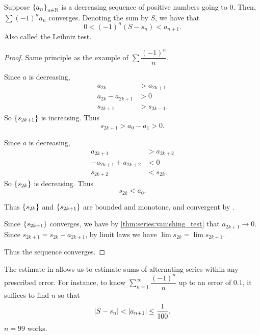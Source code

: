 \begin{thm} \label{thm:series:AST}
    Suppose $\set{a_{n}}_{n \in \N}$ is a decreasing sequence of positive numbers going to 0.
    Then, $\sum (-1)^{n} a_{n}$ converges.
    Denoting the sum by $S$, we have that \[
        0 < (-1)^{n}(S - s_{n}) < a_{n+1}.
    \] Also called the Leibniz test.
\end{thm}
\begin{proof}
    Same principle as the example of $\sum \dfrac{(-1)^{n}}{n}$.
    \begin{paracol}{2}
        \begin{leftcolumn}
            Since $a$ is decreasing,
            \begin{align*}
                a_{2k} &> a_{2k+1} \\
                a_{2k} - a_{2k+1} &> 0 \\
                s_{2k+1} &> s_{2k-1}.
            \end{align*}
            So $\set{s_{2k+1}}$ is increasing.
            Thus \[
                s_{2k + 1} > a_{0} - a_{1} > 0.
            \]
        \end{leftcolumn}
        
        \begin{rightcolumn}
            Since $a$ is decreasing,
            \begin{align*}
                a_{2k+1} &> a_{2k+2} \\
                - a_{2k+1} + a_{2k+2} &< 0 \\
                s_{2k+2} &< s_{2k}.
            \end{align*}
            So $\set{s_{2k}}$ is decreasing.
            Thus \[
                s_{2k} < a_{0}.
            \]
        \end{rightcolumn}
    \end{paracol}
    Thus $\set{s_{2k}}$ and $\set{s_{2k + 1}}$ are bounded and monotone, and convergent by .

    Since $\set{s_{2k + 1}}$ converges, we have by \cref{thm:series:vanishing_test} that $a_{2k + 1} \to 0$.
    Since $s_{2k + 1} = s_{2k} - a_{2k + 1}$, by limit laws we have $\lim s_{2k} = \lim s_{2k + 1}$.

    Thus the sequence converges.
\end{proof}

\begin{rem}
    The estimate in  allows us to estimate sums of alternating series within any prescribed error.
    For instance, to know $\sum_{n=1}^{\infty} \dfrac{(-1)^{n}}{n}$ up to an error of $0.1$, it suffices to find $n$ so that \[
        \abs{S - s_{n}} < \abs{a_{n + 1}} \leq \frac{1}{100}.
    \] $n = 99$ works.
\end{rem}
